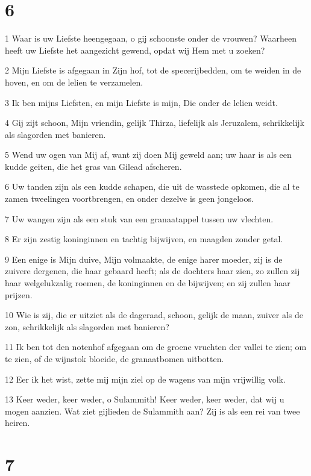 \chapter{6}

\par 1 Waar is uw Liefste heengegaan, o gij schoonste onder de vrouwen? Waarheen heeft uw Liefste het aangezicht gewend, opdat wij Hem met u zoeken?
\par 2 Mijn Liefste is afgegaan in Zijn hof, tot de specerijbedden, om te weiden in de hoven, en om de lelien te verzamelen.
\par 3 Ik ben mijns Liefsten, en mijn Liefste is mijn, Die onder de lelien weidt.
\par 4 Gij zijt schoon, Mijn vriendin, gelijk Thirza, liefelijk als Jeruzalem, schrikkelijk als slagorden met banieren.
\par 5 Wend uw ogen van Mij af, want zij doen Mij geweld aan; uw haar is als een kudde geiten, die het gras van Gilead afscheren.
\par 6 Uw tanden zijn als een kudde schapen, die uit de wasstede opkomen, die al te zamen tweelingen voortbrengen, en onder dezelve is geen jongeloos.
\par 7 Uw wangen zijn als een stuk van een granaatappel tussen uw vlechten.
\par 8 Er zijn zestig koninginnen en tachtig bijwijven, en maagden zonder getal.
\par 9 Een enige is Mijn duive, Mijn volmaakte, de enige harer moeder, zij is de zuivere dergenen, die haar gebaard heeft; als de dochters haar zien, zo zullen zij haar welgelukzalig roemen, de koninginnen en de bijwijven; en zij zullen haar prijzen.
\par 10 Wie is zij, die er uitziet als de dageraad, schoon, gelijk de maan, zuiver als de zon, schrikkelijk als slagorden met banieren?
\par 11 Ik ben tot den notenhof afgegaan om de groene vruchten der vallei te zien; om te zien, of de wijnstok bloeide, de granaatbomen uitbotten.
\par 12 Eer ik het wist, zette mij mijn ziel op de wagens van mijn vrijwillig volk.
\par 13 Keer weder, keer weder, o Sulammith! Keer weder, keer weder, dat wij u mogen aanzien. Wat ziet gijlieden de Sulammith aan? Zij is als een rei van twee heiren.

\chapter{7}

